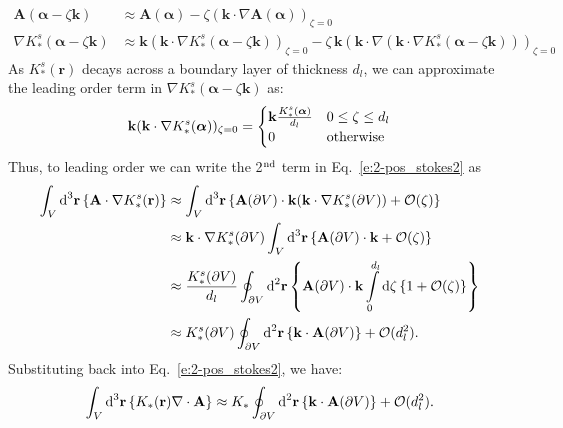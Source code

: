 \begin{align}
  \mathbf{A}(\bm{\alpha} - \zeta \mathbf{k}) &\approx \mathbf{A}(\bm{\alpha}) - \zeta (\mathbf{k} \cdot \nabla \mathbf{A}(\bm{\alpha}))_{\zeta = 0} \label{e:2-expandA} \\
  \nabla K_*^s(\bm{\alpha} - \zeta \mathbf{k}) &\approx \mathbf{k} (\mathbf{k} \cdot \nabla K_*^s(\bm{\alpha} - \zeta \mathbf{k}))_{\zeta = 0} - \zeta\, \mathbf{k}(\mathbf{k} \cdot \nabla (\mathbf{k} \cdot \nabla K_*^s(\bm{\alpha} - \zeta \mathbf{k})))_{\zeta = 0}
\end{align}
As $K_*^s(\mathbf{r})$ decays across a boundary layer of thickness $d_l$, we can approximate the leading order term in $\nabla K_*^s(\bm{\alpha} - \zeta \mathbf{k})$ as:
\begin{equation}
  \mathbf{k} (\mathbf{k} \cdot \nabla K_*^s(\bm{\alpha}))_{\zeta = 0} =
  \begin{cases}
    \mathbf{k}\frac{K_*^s(\bm{\alpha})}{d_l} & 0 \leq \zeta \leq d_l \\
    0 & \textup{otherwise}
  \end{cases}
\end{equation}
Thus, to leading order we can write the 2$^\textrm{\rm nd}$ term in Eq.~\ref{e:2-pos_stokes2} as
\begin{align}
  \int_{V} \textup{d}^3\mathbf{r} \left \{ \mathbf{A} \cdot \nabla K_{*}^s (\mathbf{r}) \right \} & \approx
  \int_{V} \textup{d}^3\mathbf{r} \left \{\mathbf{A}(\partial V) \cdot \mathbf{k}(\mathbf{k} \cdot \nabla K_*^s(\partial V))  + \mathcal{O}(\zeta) \right \} \\ & \approx
  \mathbf{k} \cdot \nabla K_*^s(\partial V) \int_{V} \textup{d}^3\mathbf{r}\left \{\mathbf{A}(\partial V) \cdot \mathbf{k} + \mathcal{O}(\zeta) \right \} \\ & \approx
  \frac{K_*^s(\partial V)}{d_l} \oint_{\partial V} \textup{d}^2\mathbf{r}\left \{\mathbf{A}(\partial V) \cdot \mathbf{k} \int\limits_{0}^{d_l} \textup{d}\zeta \left \{ 1 + \mathcal{O}(\zeta) \right \}\right \} \\ & \approx
  K_*^s(\partial V) \oint_{\partial V} \textup{d}^2\mathbf{r}\left \{ \mathbf{k}  \cdot \mathbf{A}(\partial V) \right \} + \mathcal{O}(d_l^2).
\end{align}
Substituting back into Eq.~\ref{e:2-pos_stokes2}, we have:
\begin{equation}
  \int_{V}\textup{d}^3\mathbf{r} \left \{ K_{*} (\mathbf{r}) \nabla \cdot \mathbf{A} \right \} \approx
  K_* \oint_{\partial V} \textup{d}^2\mathbf{r} \left \{ \mathbf{k} \cdot \mathbf{A}(\partial V)\right \} + \mathcal{O}(d_l^2).\label{e:2-positionF24}
\end{equation}
